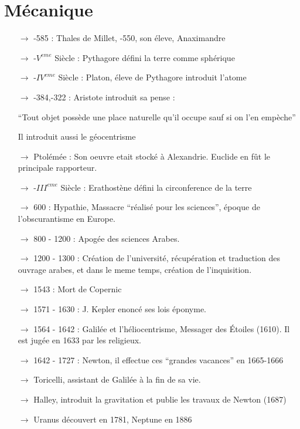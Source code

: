 \documentclass[a4paper,12pt]{report}
\begin{document}
\chapter{Mécanique}
\begin{itemize}
 \item[$\rightarrow$] -585 : Thales de Millet, -550, son éleve, Anaximandre
 \item[$\rightarrow$] -$V^{eme}$ Siècle : Pythagore défini la terre comme sphérique 
 \item[$\rightarrow$] -$IV^{eme}$ Siècle : Platon, éleve de Pythagore introduit l'atome
 \item[$\rightarrow$] -384,-322 : Aristote introduit sa pense : \begin{center}
                                                                 ``Tout objet possède une place naturelle qu'il occupe sauf si on l'en empèche''
                                                                \end{center}
 Il introduit aussi le géocentrisme
 \item[$\rightarrow$] Ptolémée : Son oeuvre etait stocké à Alexandrie. Euclide en fût le principale rapporteur. 
 \item[$\rightarrow$] -$III^{eme}$ Siècle : Erathostène défini la circonference de la terre
 \item[$\rightarrow$] 600 : Hypathie, Massacre ``réalisé pour les sciences'', époque de l'obscurantisme en Europe.
 \item[$\rightarrow$] 800 - 1200 : Apogée des sciences Arabes.
 \item[$\rightarrow$] 1200 - 1300 : Création de l'université, récupération et traduction des ouvrage arabes, et dans le meme temps, création de l'inquisition.
 \item[$\rightarrow$] 1543 : Mort de Copernic
 \item[$\rightarrow$] 1571 - 1630 : J. Kepler enoncé ses lois éponyme.
 \item[$\rightarrow$] 1564 - 1642 : Galilée et l'héliocentrisme, Messager des Étoiles (1610). Il est jugée en 1633 par les religieux.
 \item[$\rightarrow$] 1642 - 1727 : Newton, il effectue ces ``grandes vacances'' en 1665-1666
\item[$\rightarrow$] Toricelli, assistant de Galilée à la fin de sa vie.
\item[$\rightarrow$] Halley, introduit la gravitation et publie les travaux de Newton (1687)
\item[$\rightarrow$] Uranus découvert en 1781, Neptune en 1886
\end{itemize}
\end{document}
